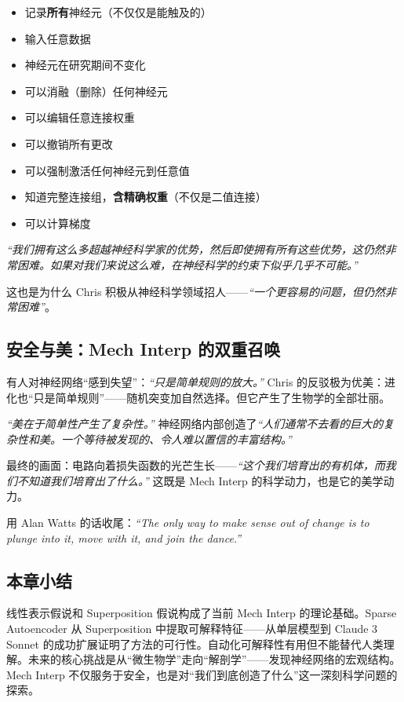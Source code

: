 \begin{itemize}
    \item 记录\textbf{所有}神经元（不仅仅是能触及的）
    \item 输入任意数据
    \item 神经元在研究期间不变化
    \item 可以消融（删除）任何神经元
    \item 可以编辑任意连接权重
    \item 可以撤销所有更改
    \item 可以强制激活任何神经元到任意值
    \item 知道完整连接组，\textbf{含精确权重}（不仅是二值连接）
    \item 可以计算梯度
\end{itemize}

\textit{``我们拥有这么多超越神经科学家的优势，然后即使拥有所有这些优势，这仍然非常困难。如果对我们来说这么难，在神经科学的约束下似乎几乎不可能。''}

这也是为什么 Chris 积极从神经科学领域招人——\textit{``一个更容易的问题，但仍然非常困难''}。

\subsection{安全与美：Mech Interp 的双重召唤}

有人对神经网络``感到失望''：\textit{``只是简单规则的放大。''} Chris 的反驳极为优美：进化也``只是简单规则''——随机突变加自然选择。但它产生了生物学的全部壮丽。

\textit{``美在于简单性产生了复杂性。''} 神经网络内部创造了\textit{``人们通常不去看的巨大的复杂性和美。一个等待被发现的、令人难以置信的丰富结构。''}

最终的画面：电路向着损失函数的光芒生长——\textit{``这个我们培育出的有机体，而我们不知道我们培育出了什么。''} 这既是 Mech Interp 的科学动力，也是它的美学动力。

用 Alan Watts 的话收尾：\textit{``The only way to make sense out of change is to plunge into it, move with it, and join the dance.''}

\subsection{本章小结}

线性表示假说和 Superposition 假说构成了当前 Mech Interp 的理论基础。Sparse Autoencoder 从 Superposition 中提取可解释特征——从单层模型到 Claude 3 Sonnet 的成功扩展证明了方法的可行性。自动化可解释性有用但不能替代人类理解。未来的核心挑战是从``微生物学''走向``解剖学''——发现神经网络的宏观结构。Mech Interp 不仅服务于安全，也是对``我们到底创造了什么''这一深刻科学问题的探索。

